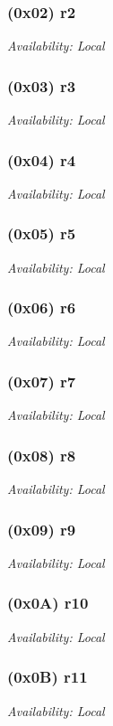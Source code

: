 \documentclass[a4paper,10pt]{article}
\begin{document}
\subsubsection{(0x02) r2}
{\small \textit{Availability: Local}}

\subsubsection{(0x03) r3}
{\small \textit{Availability: Local}}

\subsubsection{(0x04) r4}
{\small \textit{Availability: Local}}

\subsubsection{(0x05) r5}
{\small \textit{Availability: Local}}

\subsubsection{(0x06) r6}
{\small \textit{Availability: Local}}

\subsubsection{(0x07) r7}
{\small \textit{Availability: Local}}

\subsubsection{(0x08) r8}
{\small \textit{Availability: Local}}

\subsubsection{(0x09) r9}
{\small \textit{Availability: Local}}

\subsubsection{(0x0A) r10}
{\small \textit{Availability: Local}}

\subsubsection{(0x0B) r11}
{\small \textit{Availability: Local}}
\end{document}
